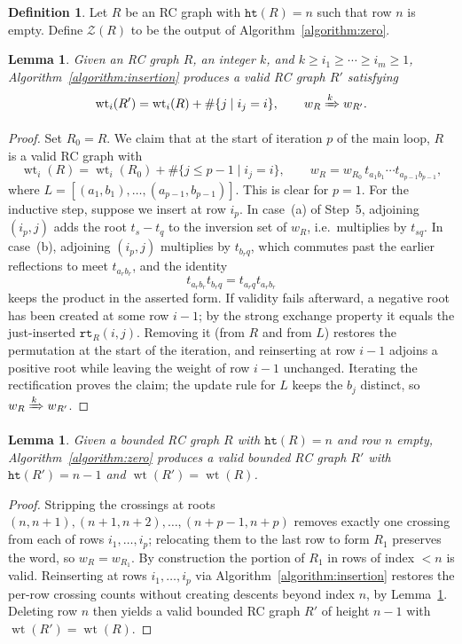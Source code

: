 \documentclass{amsart}
\newtheorem{lemma}[theorem]{Lemma}
\theoremstyle{definition}
\newtheorem{definition}[theorem]{Definition}
\theoremstyle{remark}
\newcommand{\wtt}{\operatorname{wt}}
\newcommand{\wof}[1]{w_{#1}}
\newcommand{\hr}{\mathtt{ht}}
\newcommand{\Tom}[1]{\xRightarrow{#1}}
\newcommand{\rtt}{\mathtt{rt}}
\newcommand{\zeromap}{\mathcal{Z}}
\begin{document}
\begin{definition}\label{definition:zeromap}
Let $R$ be an RC graph with $\hr(R)=n$ such that row $n$ is empty. Define $\zeromap(R)$ to be the output of Algorithm~\ref{algorithm:zero}.
\end{definition}

\begin{lemma}\label{lemma:insertworks}
Given an RC graph $R$, an integer $k$, and $k\geq i_1\geq\cdots\geq i_m\geq 1$, Algorithm~\ref{algorithm:insertion} produces a valid RC graph $R'$ satisfying
\[
\wtt_i(R')=\wtt_i(R)+\#\{j\mid i_j=i\},\qquad \wof{R}\Tom{k}\wof{R'}.
\]
\end{lemma}
\begin{proof}
Set $R_0=R$. We claim that at the start of iteration $p$ of the main loop, $R$ is a valid RC graph with
\[
\wtt_i(R)=\wtt_i(R_0)+\#\{j\leq p-1\mid i_j=i\},\qquad
\wof{R}=\wof{R_0}\,t_{a_1b_1}\cdots t_{a_{p-1}b_{p-1}},
\]
where $L=[(a_1,b_1),\ldots,(a_{p-1},b_{p-1})]$. This is clear for $p=1$. For the inductive step, suppose we insert at row $i_p$. In case~(a) of Step~5, adjoining $(i_p,j)$ adds the root $t_s-t_q$ to the inversion set of $\wof{R}$, i.e.\ multiplies by $t_{sq}$. In case~(b), adjoining $(i_p,j)$ multiplies by $t_{b_rq}$, which commutes past the earlier reflections to meet $t_{a_rb_r}$, and the identity
\[
t_{a_rb_r}t_{b_rq}=t_{a_rq}t_{a_rb_r}
\]
keeps the product in the asserted form. If validity fails afterward, a negative root has been created at some row $i-1$; by the strong exchange property it equals the just-inserted $\rtt_R(i,j)$. Removing it (from $R$ and from $L$) restores the permutation at the start of the iteration, and reinserting at row $i-1$ adjoins a positive root while leaving the weight of row $i-1$ unchanged. Iterating the rectification proves the claim; the update rule for $L$ keeps the $b_j$ distinct, so $\wof{R}\Tom{k}\wof{R'}$.
\end{proof}

\begin{lemma}\label{lemma:zerovalid}
Given a bounded RC graph $R$ with $\hr(R)=n$ and row $n$ empty, Algorithm~\ref{algorithm:zero} produces a valid bounded RC graph $R'$ with $\hr(R')=n-1$ and $\wtt(R')=\wtt(R)$.
\end{lemma}
\begin{proof}
Stripping the crossings at roots $(n,n+1),(n+1,n+2),\ldots,(n+p-1,n+p)$ removes exactly one crossing from each of rows $i_1,\ldots,i_p$; relocating them to the last row to form $R_1$ preserves the word, so $\wof{R}=\wof{R_1}$. By construction the portion of $R_1$ in rows of index $<n$ is valid. Reinserting at rows $i_1,\ldots,i_p$ via Algorithm~\ref{algorithm:insertion} restores the per-row crossing counts without creating descents beyond index $n$, by Lemma~\ref{lemma:insertworks}. Deleting row $n$ then yields a valid bounded RC graph $R'$ of height $n-1$ with $\wtt(R')=\wtt(R)$.
\end{proof}
\end{document}
